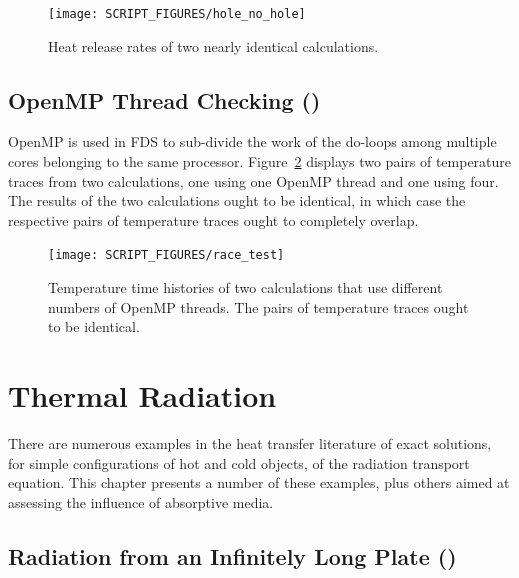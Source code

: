 \documentclass[11pt]{book}
\begin{document}
\begin{figure}[!ht]
\centering
\texttt{[image: SCRIPT\_FIGURES/hole\_no\_hole]}
\caption[Results of the  test case]{Heat release rates of two nearly identical calculations.}
\label{hole_fig}
\end{figure}


\section{OpenMP Thread Checking (\texorpdfstring{}{race\_test})}
\label{race_test}

OpenMP is used in FDS to sub-divide the work of the do-loops among multiple cores belonging to the same processor. Figure~\ref{race_test_fig} displays two pairs of temperature traces from two calculations, one using one OpenMP thread and one using four. The results of the two calculations ought to be identical, in which case the respective pairs of temperature traces ought to completely overlap.

\begin{figure}[!ht]
\centering
\texttt{[image: SCRIPT\_FIGURES/race\_test]}
\caption[Result of the ]{Temperature time histories of two calculations that use different numbers of OpenMP threads. The pairs of temperature traces ought to be identical.}
\label{race_test_fig}
\end{figure}



\chapter{Thermal Radiation}

There are numerous examples in the heat transfer literature of exact solutions, for simple configurations of hot and cold objects, of the radiation transport equation. This chapter presents a number of these examples, plus others aimed at assessing the influence of absorptive media.

\section{Radiation from an Infinitely Long Plate (\texorpdfstring{}{plate\_view\_factor}) }
\label{plate_view_factor}
\end{document}
